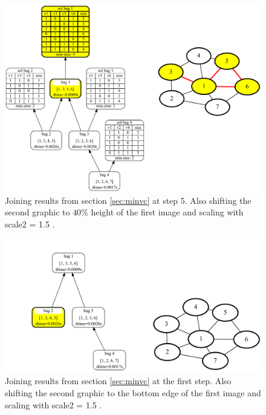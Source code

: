 \documentclass[a4paper, 12pt, bibliography=totoc]{scrartcl}
\begin{document}
\begin{figure}
	\centering
	\includegraphics[width=0.9\linewidth,height=0.9\textheight,keepaspectratio]{images/SVGJOIN/default_06sc155.pdf}
	\caption{Joining results from section \ref{sec:minvc} at step 5. Also shifting the second graphic to $40\%$ height of the first image and scaling with scale2 = 1.5 .}
	\label{fig:joinscaled5}
\end{figure}
\begin{figure}
	\centering
	\includegraphics[width=0.9\linewidth,height=0.9\textheight,keepaspectratio]{images/SVGJOIN/default_06sc15_rise1.pdf}
	\caption{Joining results from section \ref{sec:minvc} at the first step. Also shifting the second graphic to the bottom edge of the first image and scaling with scale2 = 1.5 .}
	\label{fig:joinscaledrise1}
\end{figure}
\end{document}
